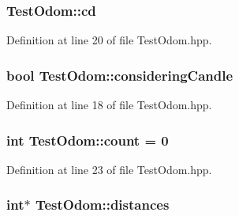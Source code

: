 \hypertarget{classTestOdom_a4ea35bef135d6bf40b9377ae6c38f1d9}{
\subsubsection[{cd}]{ Test\-Odom\-::cd\hspace{0.3cm}{\ttfamily [private]}}}\label{classTestOdom_a4ea35bef135d6bf40b9377ae6c38f1d9}


Definition at line 20 of file Test\-Odom.\-hpp.

\hypertarget{classTestOdom_aacd35fc57d03d28c22cda5c414ae72fb}{
\subsubsection[{considering\-Candle}]{\setlength{\rightskip}{0pt plus 5cm}bool Test\-Odom\-::considering\-Candle\hspace{0.3cm}{\ttfamily [private]}}}\label{classTestOdom_aacd35fc57d03d28c22cda5c414ae72fb}


Definition at line 18 of file Test\-Odom.\-hpp.

\hypertarget{classTestOdom_a336a8f23ac4a1dcc780448bc7ef7f88b}{
\subsubsection[{count}]{\setlength{\rightskip}{0pt plus 5cm}int Test\-Odom\-::count = 0\hspace{0.3cm}{\ttfamily [private]}}}\label{classTestOdom_a336a8f23ac4a1dcc780448bc7ef7f88b}


Definition at line 23 of file Test\-Odom.\-hpp.

\hypertarget{classTestOdom_a235ba0e8870aec23452d6030efaf8c7e}{
\subsubsection[{distances}]{\setlength{\rightskip}{0pt plus 5cm}int$\ast$ Test\-Odom\-::distances\hspace{0.3cm}{\ttfamily [private]}}}\label{classTestOdom_a235ba0e8870aec23452d6030efaf8c7e}


